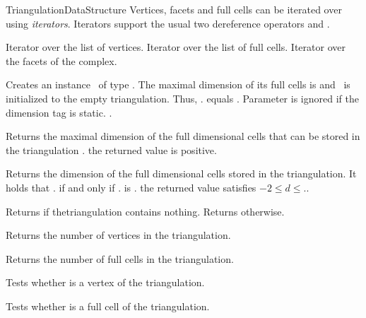 \begin{ccRefConcept}{TriangulationDataStructure}
Vertices, facets and full cells can be iterated over using \emph{iterators}.
Iterators support the usual two dereference operators  and
.

{
Iterator over the list of vertices.
}
\ccGlue
{}
{
Iterator over the list of full cells.
}
\ccGlue
{}
{
Iterator over the facets of the complex.
}

\ccGlue
{}

\ccCreation
{}

 {Creates an instance \ccVar\ of
type \ccRefName. The maximal dimension of its full cells is  and
\ccVar\ is initialized to the empty triangulation. Thus,
\ccVar. equals .
Parameter  is ignored if the dimension tag is static.
\ccPrecond {}.}



 { Returns the maximal dimension of
the full dimensional cells that can be stored in the triangulation \ccVar. \ccPostcond the
returned value is positive. }

 { Returns the dimension of the
full dimensional cells stored in the triangulation. It holds that
\ccVar. if and only if \ccVar. is
. \ccPostcond the returned value  satisfies 
$-2\leq d \leq$\ccVar.. }

 { Returns  if thetriangulation
contains nothing. Returns  otherwise. }

{Returns the number of vertices in the triangulation.}

{Returns the number of full cells  in the triangulation.}

{Tests whether  is a vertex of the triangulation. }

{Tests whether  is a full cell of the triangulation.}


\end{ccRefConcept}
